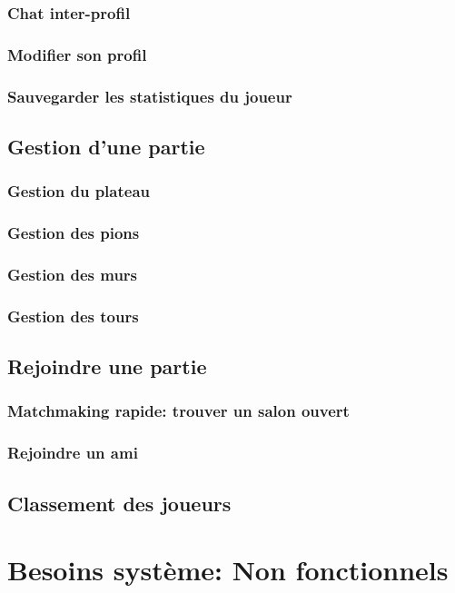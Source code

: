 \documentclass[utf8]{article}
\begin{document}
    \subsubsection{Chat inter-profil}
    \subsubsection{Modifier son profil}
    \subsubsection{Sauvegarder les statistiques du joueur}
  \subsection{Gestion d'une partie}
    \subsubsection{Gestion du plateau}
    \subsubsection{Gestion des pions}
    \subsubsection{Gestion des murs}
    \subsubsection{Gestion des tours}
  \subsection{Rejoindre une partie}
    \subsubsection{Matchmaking rapide: trouver un salon ouvert}
    \subsubsection{Rejoindre un ami}
  \subsection{Classement des joueurs}



\section{Besoins système: Non fonctionnels}
\end{document}
